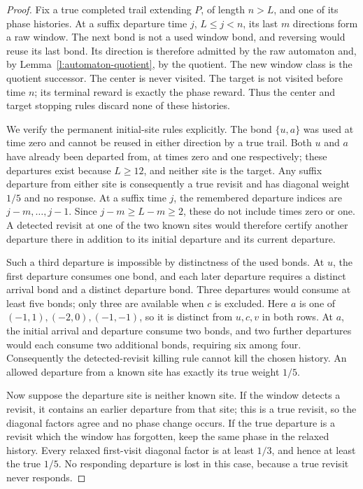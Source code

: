 \begin{proof}
Fix a true completed trail extending \(P\), of length \(n>L\),
and one of its phase histories. At a suffix departure time
\(j\), \(L\le j<n\), its last \(m\) directions form a raw
window. The next bond is not a used window bond, and reversing
would reuse its last bond. Its direction is therefore admitted by
the raw automaton and, by Lemma~\ref{l:automaton-quotient}, by the
quotient. The new window class is the quotient successor.
The center is never visited. The target is not visited before time
\(n\); its terminal reward is exactly the phase reward. Thus the
center and target stopping rules discard none of these histories.

We verify the permanent initial-site rules explicitly. The bond
\(\{u,a\}\) was used at time zero and cannot be reused in either
direction by a true trail. Both \(u\) and \(a\) have already
been departed from, at times zero and one respectively; these
departures exist because \(L\ge12\), and neither site is the
target. Any suffix departure from either site is consequently a
true revisit and has diagonal weight \(1/5\) and no response.
At a suffix time \(j\), the remembered departure indices are
\(j-m,\ldots,j-1\). Since \(j-m\ge L-m\ge2\), these do not
include times zero or one. A detected revisit at one of the two
known sites would therefore certify another departure there in
addition to its initial departure and its current departure.

Such a third departure is impossible by distinctness of the used
bonds. At \(u\), the first departure consumes one bond, and each
later departure requires a distinct arrival bond and a distinct
departure bond. Three departures would consume at least five
bonds; only three are available when \(c\) is excluded.
Here \(a\) is one of \((-1,1),(-2,0),(-1,-1)\), so it is distinct
from \(u,c,v\) in both rows. At \(a\), the initial arrival and
departure consume two
bonds, and two further departures would each consume two additional
bonds, requiring six among four. Consequently the detected-revisit
killing rule cannot kill the chosen history. An allowed departure
from a known site has exactly its true weight \(1/5\).

Now suppose the departure site is neither known site. If the
window detects a revisit, it contains an earlier departure from
that site; this is a true revisit, so the diagonal factors agree
and no phase change occurs. If the true departure is a revisit
which the window has forgotten, keep the same phase in the relaxed
history. Every relaxed first-visit diagonal factor is at least
\(1/3\), and hence at least the true \(1/5\). No responding
departure is lost in this case, because a true revisit never responds.


\end{proof}
